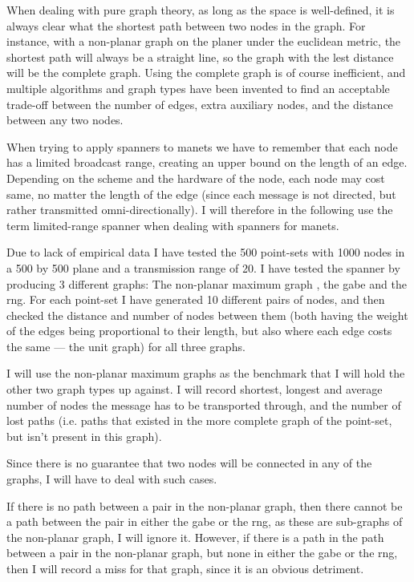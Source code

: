 When dealing with pure graph theory, as long as the space is well-defined, it is always clear what the shortest path between two nodes in the graph. For instance, with a non-planar graph on the planer under the euclidean metric, the shortest path will always be a straight line, so the graph with the lest distance will be the complete graph. Using the complete graph is of course inefficient, and multiple algorithms and graph types have been invented to find an acceptable trade-off between the number of edges, extra auxiliary nodes, and the distance between any two nodes.

When trying to apply spanners to \acp{manet} we have to remember that each node has a limited broadcast range, creating an upper bound on the length of an edge. Depending on the scheme and the hardware of the node, each node may cost same, no matter the length of the edge (since each message is not directed, but rather transmitted omni-directionally). I will therefore in the following use the term limited-range spanner when dealing with spanners for \acp{manet}. 


Due to lack of empirical data I have tested the   500 point-sets with 1000 nodes in a 500 by 500 plane and a transmission range of 20. I have tested the spanner by producing 3 different graphs: The non-planar maximum graph , the \ac{gabe} and the \ac{rng}. For each point-set I have generated 10 different pairs of nodes, and then checked the distance and number of nodes between them (both having the weight of the edges being proportional to their length, but also where each edge costs the same --- the unit graph) for all three graphs. 

I will use the non-planar maximum graphs as the benchmark that I will hold the other two graph types up against. I will record shortest, longest and average number of nodes the message has to be transported through, and the number of lost paths (i.e. paths that existed in the more complete graph of the point-set, but isn't present in this graph). 

Since there is no guarantee that two nodes will be connected in any of the graphs, I will have to deal with such cases.

If there is no path between a pair in the non-planar graph, then there cannot be a path between the pair in either the \ac{gabe} or the \ac{rng}, as these are sub-graphs of the non-planar graph, I will ignore it. However, if there is a path in the path between a pair in the non-planar graph, but none in either the \ac{gabe} or the \ac{rng}, then I will record a miss for that graph, since it is an obvious detriment. 

